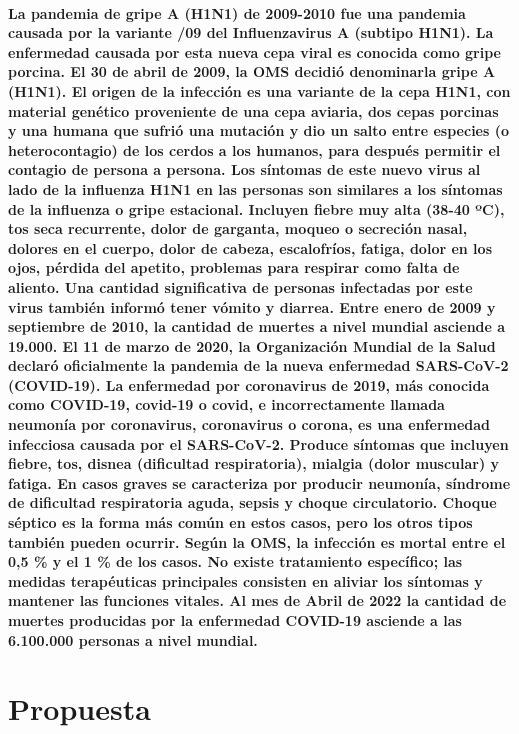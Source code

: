\documentclass[12pt]{article}
\begin{document}
\paragraph{
La pandemia de gripe A (H1N1) de 2009-2010 fue una pandemia causada por la variante /09 del Influenzavirus A (subtipo H1N1). La enfermedad causada por esta nueva cepa viral es conocida como gripe porcina. El 30 de abril de 2009, la OMS decidió denominarla gripe A (H1N1). 
El origen de la infección es una variante de la cepa H1N1, con material genético proveniente de una cepa aviaria, dos cepas porcinas y una humana que sufrió una mutación y dio un salto entre especies (o heterocontagio) de los cerdos a los humanos, para después permitir el contagio de persona a persona.
Los síntomas de este nuevo virus al lado de la influenza H1N1 en las personas son similares a los síntomas de la influenza o gripe estacional. Incluyen fiebre muy alta (38-40 ºC), tos seca recurrente, dolor de garganta, moqueo o secreción nasal, dolores en el cuerpo, dolor de cabeza, escalofríos, fatiga, dolor en los ojos, pérdida del apetito, problemas para respirar como falta de aliento. Una cantidad significativa de personas infectadas por este virus también informó tener vómito y diarrea.
Entre enero de 2009 y septiembre de 2010, la cantidad de muertes a nivel mundial asciende a 19.000.
El 11 de marzo de 2020, la Organización Mundial de la Salud declaró oficialmente la pandemia de la nueva enfermedad SARS-CoV-2 (COVID-19). 
La enfermedad por coronavirus de 2019,​ más conocida como COVID-19, covid-19 o covid, e incorrectamente llamada neumonía por coronavirus, coronavirus​ o corona, es una enfermedad infecciosa causada por el SARS-CoV-2.
Produce síntomas que incluyen fiebre, tos,​ disnea (dificultad respiratoria), mialgia (dolor muscular) y fatiga. En casos graves se caracteriza por producir neumonía, síndrome de dificultad respiratoria aguda,​ sepsis​ y choque circulatorio. Choque séptico es la forma más común en estos casos, pero los otros tipos también pueden ocurrir.
Según la OMS, la infección es mortal entre el 0,5 \% y el 1 \% de los casos.​ No existe tratamiento específico; las medidas terapéuticas principales consisten en aliviar los síntomas y mantener las funciones vitales.
Al mes de Abril de 2022 la cantidad de muertes producidas por la enfermedad COVID-19 asciende a las 6.100.000 personas a nivel mundial.}
\section{Propuesta}
\end{document}

